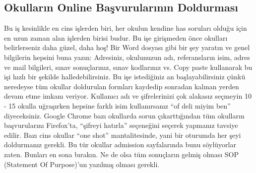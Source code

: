 \documentclass[12pt]{article}
\begin{document}
\subsection{Okulların Online Başvurularının Doldurması}
Bu iş kesinlikle en cins işlerden biri, her okulun kendine has soruları olduğu için en uzun zaman alan işlerden birisi budur. Bu işe girişmeden önce okulları belirlerseniz daha güzel, daha hoş! Bir Word dosyası gibi bir şey yaratın ve genel bilgilerin hepsini buna yazın: Adresiniz, okulunuzun adı, referansların isim, adres ve mail bilgileri, sınav sonuçlarınız, sınav kodlarınız vs. Copy paste kullanarak bu işi hızlı bir şekilde halledebilirsiniz. Bu işe istediğiniz an başlayabilirsiniz çünkü neredeyse tüm okullar doldurulan formları kaydedip sonradan kalınan yerden devam etme imkanı veriyor. Kullanıcı adı ve şifrelerinizi çok alakasız seçmeyin 10 - 15 okulla uğraşırken hepsine farklı isim kullanırsanız “of deli miyim ben” diyeceksiniz. Google Chrome bazı okullarda sorun çıkarttığından tüm okulların başvurularını Firefox’ta, “şifreyi hatırla” seçeneğini seçerek yapmanız tavsiye edilir. Bazı cins okullar “one shot” mantalitesinde, yani bir oturumda her şeyi doldurmanız gerekli. Bu tür okullar admission sayfalarında bunu söylüyorlar zaten. Bunları en sona bırakın. Ne de olsa tüm sonuçların gelmiş olması SOP (Statement Of Purpose)’un yazılmış olması gerekli.
\end{document}
